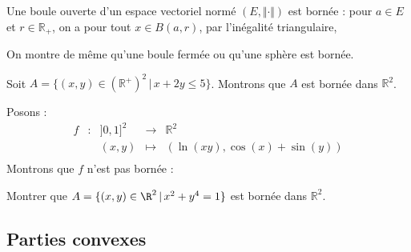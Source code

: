 \documentclass[a4paper,10pt]{report}
\begin{document}
\begin{exems}
\item Une boule ouverte d'un espace vectoriel normé $(E, \Vert \cdot \Vert)$ est bornée : pour $a \in E$ et $r \in \mathbb{R}_+$, on a pour tout $x \in B(a,r)$, par l'inégalité triangulaire,

\vspace{2cm}
On montre de même qu'une boule fermée ou qu'une sphère est bornée.
\item Soit $A = \lbrace (x,y) \in (\mathbb{R}^+)^2 \, \vert \, x+2y \leq 5 \rbrace$. Montrons que $A$ est bornée dans $\mathbb{R}^2$.

\vspace{4cm}
\item Posons :
$$ \begin{array}{ccccl}
f & : & ]0,1]^2 & \rightarrow & \mathbb{R}^2 \\
& & (x,y)   & \mapsto & (\ln(xy), \cos(x)+ \sin(y)) \\
\end{array}$$
Montrons que $f$ n'est pas bornée : 

\vspace{4cm}
\end{exems}

\begin{ApplicationDirecte} Montrer que $A = \lbrace (x,y)\in\R^2 \, \vert \, x^2+y^4=1 \rbrace$ est bornée dans $\mathbb{R}^2$.
\end{ApplicationDirecte}

\subsection{Parties convexes}
\end{document}
